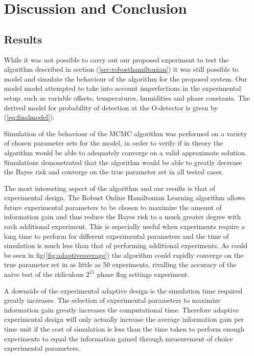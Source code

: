 
\chapter{Discussion and Conclusion} %
\label{Chapter5}

\section{Results}
While it was not possible to carry out our proposed experiment to test the algorithm described in section (\ref{sec:robosthamiltonian}) it was still possible to model and simulate the behaviour of the algorithm for the proposed system. Our model model attempted to take into account imperfections in the experimental setup, such as variable offsets, temperatures, humidities and phase constants. The derived model for probability of detection at the O-detector is given by (\ref{eq:finalmodel}).

Simulation of the behaviour of the MCMC algorithm was performed on a variety of chosen parameter sets for the model, in order to verify if in theory the algorithm would be able to adequately converge on a valid approximate solution. Simulations demonstrated that the algorithm would be able to greatly decrease the Bayes risk and converge on the true parameter set in all tested cases.   

The most interesting aspect of the algorithm and our results is that of experimental design. The Robust Online Hamiltonian Learning algorithm allows future experimental parameters to be chosen to maximize the amount of information gain and thus reduce the Bayes risk to a much greater degree with each additional experiment. This is especially useful when experiments require a long time to perform for different experimental parameters and the time of simulation is much less than that of performing additional experiments. As could be seen in fig(\ref{fig:adaptiveaverage}) the algorithm could rapidly converge on the true parameter set in as little as $50$ experiments, rivalling the accuracy of the naive test of the ridiculous $2^15$ phase flag settings experiment. 

A downside of the experimental adaptive design is the simulation time required greatly increases. The selection of experimental parameters to maximize information gain greatly increases the computational time. Therefore adaptive experimental design will only actually increase the average information gain per time unit if the cost of simulation is less than the time taken to perform enough experiments to equal the information gained through measurement of choice experimental parameters. 


